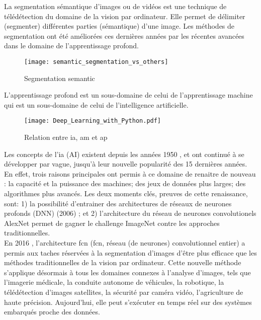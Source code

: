 ﻿\noindent La segmentation sémantique d'images ou de vidéos est une technique de télédétection du domaine de la vision par ordinateur. Elle permet de délimiter (segmenter) différentes parties (sémantique) d'une image. Les méthodes de segmentation ont été améliorées ces dernières années par les récentes avancées dans le domaine de l'apprentissage profond. 
\begin{figure}[H]
   \centering
   \texttt{[image: semantic\_segmentation\_vs\_others]}
   \caption[Segmentation semantic]{Segmentation semantic\cite[p.~1]{wu_recent_2019}}
   \label{fig:semantic_segmentation_vs_others}
\end{figure}
\noindent L’apprentissage profond est un sous-domaine de celui de l'apprentissage machine qui est un sous-domaine de celui de l'intelligence artificielle. 
\begin{figure}[H]
   \centering
   \texttt{[image: Deep\_Learning\_with\_Python.pdf]}
   \caption[Relation entre \acrlong{ia}, \acrlong{am} et \acrlong{ap}]{Relation entre \acrlong{ia}, \acrlong{am} et \acrlong{ap} \cite[p.~4]{chollet_deep_2018}}
   \label{fig:ia_ml_ap}
\end{figure}
\noindent Les concepts de l'\lowercase{\acrlong{ia}} (AI) existent depuis les années 1950 \cite[p.~4]{chollet_deep_2018} \cite[p.~1]{alom_history_2018}, et ont continué à se développer par vague, jusqu'à leur nouvelle popularité des 15 dernières années. En effet, trois raisons principales ont permis à ce domaine de renaitre de nouveau \cite[p.~20]{chollet_deep_2018}: la capacité et la puissance des machines; des jeux de données plus larges; des algorithmes plus avancés. Les deux moments clés, preuves de cette renaissance, sont: 1) la possibilité d'entrainer des architectures de réseaux de neurones profonds (DNN) (2006) \cite[p.~6]{alom_history_2018}; et 2) l'architecture du réseau de neurones convolutionels AlexNet permet de  gagner le challenge ImageNet contre les approches traditionnelles\cite[p.~11]{alom_history_2018}. 
\vspace{\baselineskip}
\\
\noindent En 2016 \cite[p.~14]{alom_history_2018}, l'architecture \acrshort{fcn} (\acrlong{fcn}, réseau (de neurones) convolutionnel entier) a permis aux taches réservées à la segmentation d'images d'être plus efficace que les méthodes traditionnelles de la vision par ordinateur. Cette nouvelle méthode s'applique désormais à tous les domaines connexes à l'analyse d'images, tels que l'imagerie médicale, la conduite autonome de véhicules, la robotique, la télédétection d'images satellites, la sécurité par caméra vidéo, l'agriculture de haute précision. Aujourd'hui, elle peut s'exécuter en temps réel sur des systèmes embarqués proche des données. 
